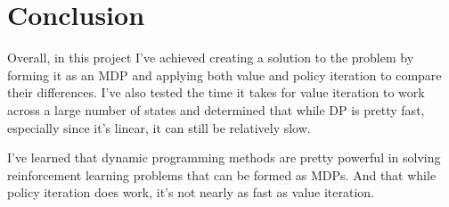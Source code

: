 \documentclass[12pt]{article}
\begin{document}
\section{Conclusion}

Overall, in this project I've achieved creating a solution to the problem by forming it as an MDP and applying both value and policy iteration to compare their differences. I've also tested the time it takes for value iteration to work across a large number of states and determined that while DP is pretty fast, especially since it's linear, it can still be relatively slow.

I've learned that dynamic programming methods are pretty powerful in solving reinforcement learning problems that can be formed as MDPs. And that while policy iteration does work, it's not nearly as fast as value iteration.



\end{document}
